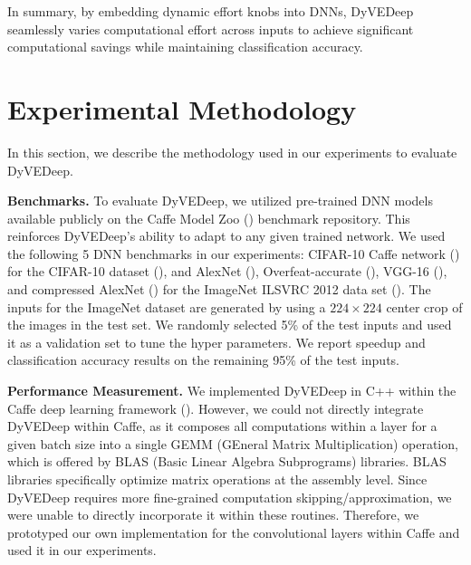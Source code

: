 \documentclass{article} %
\begin{document}
In summary, by embedding dynamic effort knobs into DNNs, DyVEDeep seamlessly varies computational effort across inputs to achieve significant computational savings while maintaining classification accuracy. 

\section{Experimental Methodology} \label{sec:exptmeth}

In this section, we describe the methodology used in our experiments to evaluate DyVEDeep.

{\bf Benchmarks.} To evaluate DyVEDeep, we utilized pre-trained DNN models available publicly on the Caffe Model Zoo (\cite{caffemodelzoo})  benchmark repository. This reinforces DyVEDeep's ability to adapt to any given trained network. We used the following 5 DNN benchmarks in our experiments: CIFAR-10 Caffe network (\cite{cifar-10network}) for the CIFAR-10 dataset (\cite{Krizhevsky09learningmultiple}), and AlexNet (\cite{NIPS2012_4824}), Overfeat-accurate (\cite{Sermanet_overfeat:integrated}), VGG-16 (\cite{DBLP:journals/corr/SimonyanZ14a}), and compressed AlexNet (\cite{DBLP:journals/corr/HanMD15}) for the ImageNet ILSVRC 2012 data set (\cite{DBLP:conf/cvpr/DengDSLL009}). The inputs for the ImageNet dataset are generated by using a $224 \times 224$ center crop of the images in the test set. We randomly selected 5\% of the test inputs and used it as a validation set to tune the hyper parameters. We report speedup and classification accuracy results on the remaining 95\% of the test inputs. 


{\bf Performance Measurement.} We implemented DyVEDeep in C++ within the Caffe deep learning framework (\cite{jia2014caffe}). However, we could not directly integrate DyVEDeep within Caffe, as it composes all computations within a layer for a given batch size into a single GEMM (GEneral Matrix Multiplication) operation, which is offered by BLAS (Basic Linear Algebra Subprograms) libraries. BLAS libraries specifically optimize matrix operations at the assembly level. Since DyVEDeep requires more fine-grained computation skipping/approximation, we were unable to directly incorporate it within these routines. Therefore, we prototyped our own implementation for the convolutional layers within Caffe and used it in our experiments.
\end{document}
